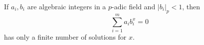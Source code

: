 \begin{proposition}\label{eq:181}
    If $a_i,b_i$ are algebraic integers in a $p$-adic field and $|b_i|_p<1$, then
\[
    \sum_{i=1}^{m}a_i b_i^x=0
\]
    has only a finite number of solutions for $x$.
\end{proposition}
